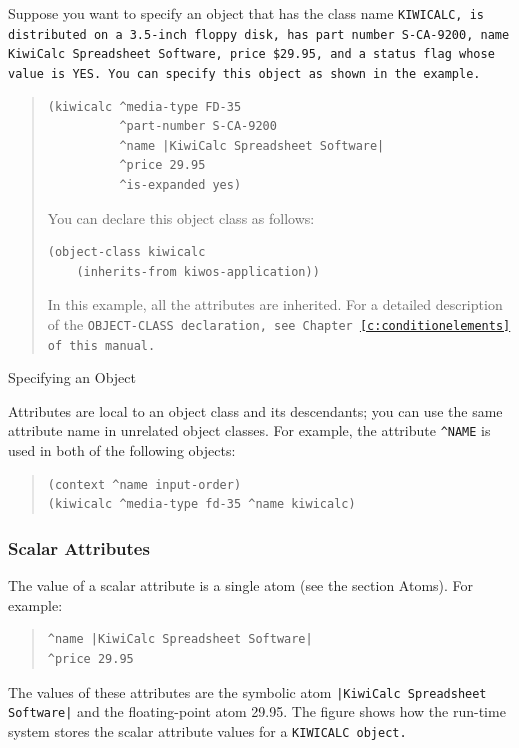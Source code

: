 Suppose you want to specify an object that has the class name
\tt{KIWICALC}, is distributed on a 3.5-inch floppy disk, has part
number S-CA-9200, name KiwiCalc Spreadsheet Software, price {\$}29.95,
and a status flag whose value is \tt{YES}. You can specify this object
as shown in the example.

\begin{example}[h]
\begin{quote}
\begin{verbatim}
(kiwicalc ^media-type FD-35
          ^part-number S-CA-9200
          ^name |KiwiCalc Spreadsheet Software|
          ^price 29.95
          ^is-expanded yes)
\end{verbatim}
You can declare this object class as follows:
\begin{verbatim}
(object-class kiwicalc
    (inherits-from kiwos-application))
\end{verbatim}           
In this example, all the attributes are inherited. For a detailed
description of the \tt{OBJECT-CLASS} declaration, see
Chapter~\ref{c:conditionelements} of this manual.
\end{quote}
\caption{Specifying an Object}
\label{e:specobj}
\end{example}

Attributes are local to an object class and its descendants;
you can use the same attribute name in unrelated object
classes. For example, the attribute \verb|^NAME| is used in both of
the following objects:

\begin{quote}
\begin{verbatim}
(context ^name input-order)
(kiwicalc ^media-type fd-35 ^name kiwicalc)
\end{verbatim}
\end{quote}

\subsubsection{Scalar Attributes}

The value of a scalar attribute is a single atom (see the
section Atoms). For example:

\begin{quote}
\begin{verbatim}
^name |KiwiCalc Spreadsheet Software|
^price 29.95
\end{verbatim}
\end{quote}

The values of these attributes are the symbolic atom
\verb,|KiwiCalc Spreadsheet Software|, and the floating-point atom
29.95. The figure shows how the run-time system stores the
scalar attribute values for a \tt{KIWICALC} object.

